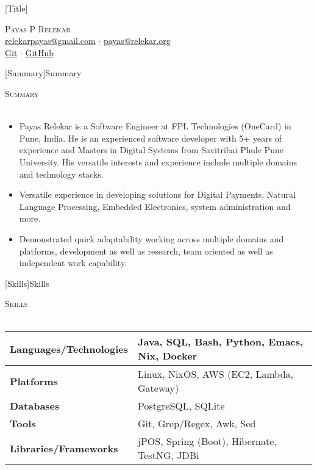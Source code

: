 \documentclass[a4paper]{article}
\newcommand{\lineunder} {
    \vspace*{-8pt} \\
    \hspace*{-18pt} \hrulefill \\
}
\newcommand{\header} [1] {
    {\hspace*{-18pt}\vspace*{6pt} \textsc{#1}}
    \vspace*{-6pt} \lineunder
}
\begin{document}
\vspace*{-40pt}

\vspace*{-10pt}
[Title]{}
\begin{center}
	{\Huge \scshape {Payas P Relekar}}\\
	\href{mailto:relekarpayas@gmail.com}{relekarpayas@gmail.com} $\cdot$ \href{mailto:payas@relekar.org}{payas@relekar.org} \\
	\href{https://git.bhankas.org/payas/}{Git} $\cdot$ \href{https://github.com/bhankas/}{GitHub}\\
\end{center}

[Summary]{Summary}
\header{Summary}
\vspace{1mm}

\begin{itemize} \itemsep 1pt
	\item Payas Relekar is a Software Engineer at FPL Technologies (OneCard) in Pune, India. He is an experienced software developer with 5+ years of experience and Masters in Digital Systems from Savitribai Phule Pune University. His versatile interests and experience include multiple domains and technology stacks.
	\item Versatile experience in developing solutions for Digital Payments, Natural Language Processing, Embedded Electronics, system administration and more.
	\item Demonstrated quick adaptability working across multiple domains and platforms, development as well as research, team oriented as well as independent work capability.
\end{itemize}

[Skills]{Skills}
\header{Skills}
\vspace{1mm}
\bgroup
\setlength{\arrayrulewidth}{0.2mm}
\def\arraystretch{1.2}
\begin{tabularx}{\textwidth}{ | X | X | }
	\hline
	\textbf{Languages/Technologies} & Java, SQL, Bash, Python, Emacs, Nix, Docker  \\
	\hline
	\textbf{Platforms}              & Linux, NixOS, AWS (EC2, Lambda, Gateway)     \\
	\hline
	\textbf{Databases}              & PostgreSQL, SQLite                           \\
	\hline
	\textbf{Tools}                  & Git, Grep/Regex, Awk, Sed                    \\
	\hline
	\textbf{Libraries/Frameworks}   & jPOS, Spring (Boot), Hibernate, TestNG, JDBi \\
	\hline
\end{tabularx}
\egroup
\vspace{2mm}
\end{document}
